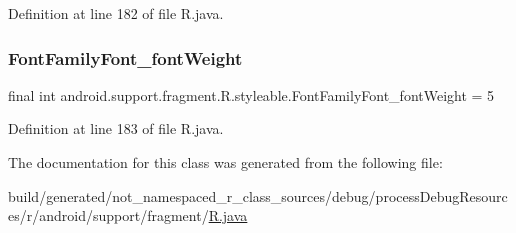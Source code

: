 Definition at line 182 of file R.\+java.

\mbox{\label{classandroid_1_1support_1_1fragment_1_1_r_1_1styleable_a8af402b9cdd397b2b12747e94e2e362c}} 
\subsubsection{\texorpdfstring{FontFamilyFont\_fontWeight}{FontFamilyFont\_fontWeight}}
{\footnotesize\ttfamily final int android.\+support.\+fragment.\+R.\+styleable.\+Font\+Family\+Font\+\_\+font\+Weight = 5\hspace{0.3cm}{\ttfamily [static]}}



Definition at line 183 of file R.\+java.



The documentation for this class was generated from the following file\+:\begin{DoxyCompactItemize}
\item 
build/generated/not\+\_\+namespaced\+\_\+r\+\_\+class\+\_\+sources/debug/process\+Debug\+Resources/r/android/support/fragment/\mbox{\hyperlink{android_2support_2fragment_2_r_8java}{R.\+java}}\end{DoxyCompactItemize}
